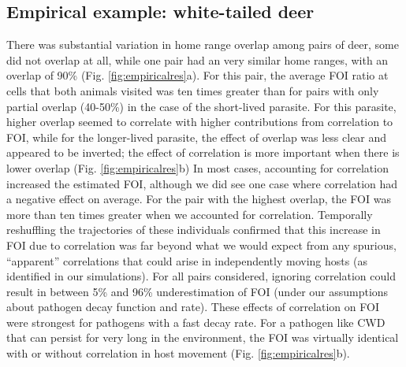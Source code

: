 \documentclass[letterpaper]{article}
\begin{document}
\subsection*{Empirical example: white-tailed deer}

There was substantial variation in home range overlap among pairs of deer, some did not overlap at all, while one pair had an very similar home ranges, with an overlap of 90\% (Fig. \ref{fig:empiricalres}a). For this pair, the average FOI ratio at cells that both animals visited was ten times greater than for pairs with only partial overlap (40-50\%) in the case of the short-lived parasite. For this parasite, higher overlap seemed to correlate with higher contributions from correlation to FOI, while for the longer-lived parasite, the effect of overlap was less clear and appeared to be inverted; the effect of correlation is more important when there is lower overlap (Fig. \ref{fig:empiricalres}b)%
In most cases, accounting for correlation increased the estimated FOI, although we did see one case where correlation had a negative effect on average. %
For the pair with the highest overlap, the FOI was more than ten times greater when we accounted for correlation. Temporally reshuffling the trajectories of these individuals  \citet[following ][]{Spiegel2016} confirmed that this increase in FOI due to correlation was far beyond what we would expect from any  spurious, ``apparent'' correlations that could arise in independently moving hosts (as identified in our simulations). For all pairs considered, ignoring correlation could result in between 5\% and 96\% underestimation of FOI (under our assumptions about pathogen decay function and rate). These effects of correlation on FOI were strongest for pathogens with a fast decay rate. For a pathogen like CWD that can persist for very long in the environment, the FOI was virtually identical with or without correlation in host movement (Fig. \ref{fig:empiricalres}b). 
\end{document}
